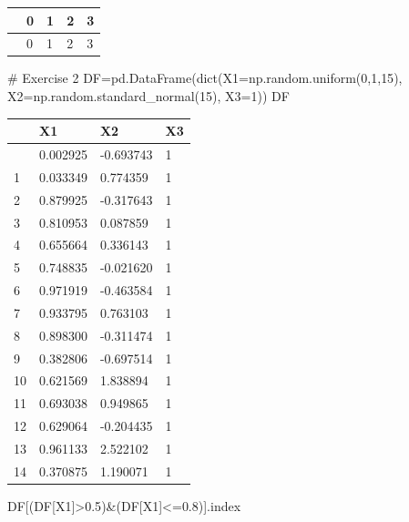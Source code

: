 \documentclass[
  a4paper,
  DIV=11,
  numbers=noendperiod]{scrreprt}
\newenvironment{Shaded}{\begin{snugshade}}{\end{snugshade}}
\newcommand{\BuiltInTok}[1]{\textcolor[rgb]{0.00,0.23,0.31}{#1}}
\newcommand{\CommentTok}[1]{\textcolor[rgb]{0.37,0.37,0.37}{#1}}
\newcommand{\DecValTok}[1]{\textcolor[rgb]{0.68,0.00,0.00}{#1}}
\newcommand{\FloatTok}[1]{\textcolor[rgb]{0.68,0.00,0.00}{#1}}
\newcommand{\NormalTok}[1]{\textcolor[rgb]{0.00,0.23,0.31}{#1}}
\newcommand{\OperatorTok}[1]{\textcolor[rgb]{0.37,0.37,0.37}{#1}}
\newcommand{\StringTok}[1]{\textcolor[rgb]{0.13,0.47,0.30}{#1}}
\begin{document}
\begin{longtable}[]{@{}lllll@{}}
\toprule\noalign{}
& 0 & 1 & 2 & 3 \\
\midrule\noalign{}
\endhead
\bottomrule\noalign{}
\endlastfoot
0 & 0 & 1 & 2 & 3 \\
\end{longtable}

\begin{Shaded}
\begin{Highlighting}[]
\CommentTok{\# Exercise 2}
\NormalTok{DF}\OperatorTok{=}\NormalTok{pd.DataFrame(}\BuiltInTok{dict}\NormalTok{(X1}\OperatorTok{=}\NormalTok{np.random.uniform(}\DecValTok{0}\NormalTok{,}\DecValTok{1}\NormalTok{,}\DecValTok{15}\NormalTok{),}
\NormalTok{                X2}\OperatorTok{=}\NormalTok{np.random.standard\_normal(}\DecValTok{15}\NormalTok{),}
\NormalTok{                X3}\OperatorTok{=}\DecValTok{1}\NormalTok{))}
\NormalTok{DF}
\end{Highlighting}
\end{Shaded}

\begin{longtable}[]{@{}llll@{}}
\toprule\noalign{}
& X1 & X2 & X3 \\
\midrule\noalign{}
\endhead
\bottomrule\noalign{}
\endlastfoot
0 & 0.002925 & -0.693743 & 1 \\
1 & 0.033349 & 0.774359 & 1 \\
2 & 0.879925 & -0.317643 & 1 \\
3 & 0.810953 & 0.087859 & 1 \\
4 & 0.655664 & 0.336143 & 1 \\
5 & 0.748835 & -0.021620 & 1 \\
6 & 0.971919 & -0.463584 & 1 \\
7 & 0.933795 & 0.763103 & 1 \\
8 & 0.898300 & -0.311474 & 1 \\
9 & 0.382806 & -0.697514 & 1 \\
10 & 0.621569 & 1.838894 & 1 \\
11 & 0.693038 & 0.949865 & 1 \\
12 & 0.629064 & -0.204435 & 1 \\
13 & 0.961133 & 2.522102 & 1 \\
14 & 0.370875 & 1.190071 & 1 \\
\end{longtable}

\begin{Shaded}
\begin{Highlighting}[]
\NormalTok{DF[(DF[}\StringTok{\textquotesingle{}X1\textquotesingle{}}\NormalTok{]}\OperatorTok{\textgreater{}}\FloatTok{0.5}\NormalTok{)}\OperatorTok{\&}\NormalTok{(DF[}\StringTok{\textquotesingle{}X1\textquotesingle{}}\NormalTok{]}\OperatorTok{\textless{}=}\FloatTok{0.8}\NormalTok{)].index}
\end{Highlighting}
\end{Shaded}
\end{document}

